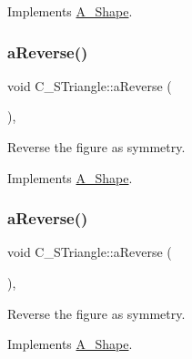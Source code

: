 Implements \hyperlink{classA__Shape_ab284298db1b557ccfa7ba6de7a5fee2c}{A\+\_\+\+Shape}.

\mbox{\label{classC__STriangle_a5402899ec4ea0de3ca3e7aa6f184a1c7}} 
\subsubsection{\texorpdfstring{a\+Reverse()}{aReverse()}\hspace{0.1cm}{\footnotesize\ttfamily [1/2]}}
{\footnotesize\ttfamily void C\+\_\+\+S\+Triangle\+::a\+Reverse (\begin{DoxyParamCaption}{ }\end{DoxyParamCaption})\hspace{0.3cm}{\ttfamily [override]}, {\ttfamily [virtual]}}



Reverse the figure as symmetry. 



Implements \hyperlink{classA__Shape_afe2c7969d647f6358da13879a7534ecb}{A\+\_\+\+Shape}.

\mbox{\label{classC__STriangle_a5402899ec4ea0de3ca3e7aa6f184a1c7}} 
\subsubsection{\texorpdfstring{a\+Reverse()}{aReverse()}\hspace{0.1cm}{\footnotesize\ttfamily [2/2]}}
{\footnotesize\ttfamily void C\+\_\+\+S\+Triangle\+::a\+Reverse (\begin{DoxyParamCaption}{ }\end{DoxyParamCaption})\hspace{0.3cm}{\ttfamily [override]}, {\ttfamily [virtual]}}



Reverse the figure as symmetry. 



Implements \hyperlink{classA__Shape_afe2c7969d647f6358da13879a7534ecb}{A\+\_\+\+Shape}.

\mbox{\label{classC__STriangle_aa3cad7b7367c253000cf0f91f55ba600}} 
